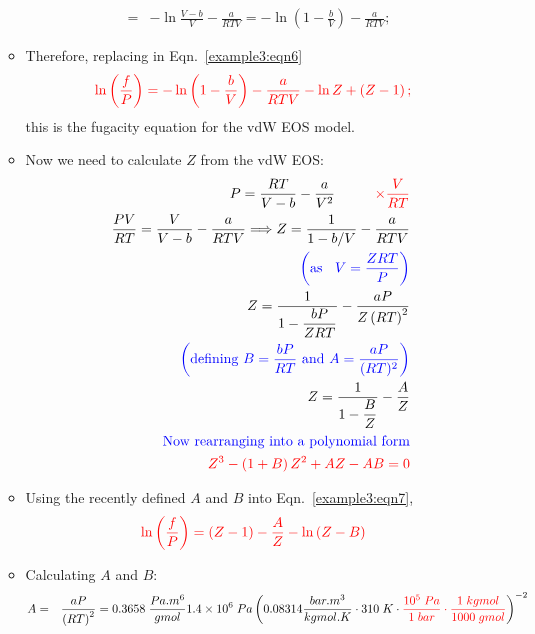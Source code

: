 \documentclass[12pts,a4paper,amsmath,amssymb,floatfix]{article}%
\newcommand{\frc}{\displaystyle\frac}
\newcommand{\red}{\textcolor{red}}
\newcommand{\blue}{\textcolor{blue}}
\begin{document}
\begin{enumerate}[label=\bfseries Example \arabic*]
\begin{itemize}
\begin{eqnarray}
           &=& -\ln\frc{V-b}{V} - \frc{a}{RTV} = -\ln\left(1-\frc{b}{V}\right) - \frc{a}{RTV}; \nonumber
        \end{eqnarray}
     \item Therefore, replacing in Eqn.~\ref{example3:eqn6}
        \begin{equation}
           \red{\ln\left(\frc{f}{P}\right) = -\ln\left(1-\frc{b}{V}\right) - \frc{a}{RTV} - \ln Z + \left(Z - 1\right);}\label{example3:eqn7}
        \end{equation}
        this is the fugacity equation for the vdW EOS model.
     \item Now we need to calculate $Z$ from the vdW EOS:           
        \begin{eqnarray}
           && P = \frc{RT}{V-b} - \frc{a}{V^{2}} \hspace{1cm} \red{\times \frc{V}{RT} } \nonumber \\
           && \frc{PV}{RT} = \frc{V}{V-b} - \frc{a}{RTV} \Longrightarrow Z=\frc{1}{1- b/V} - \frc{a}{RTV} \nonumber \\
           && \blue{\left(\text{as }\;\; V=\frc{ZRT}{P} \right)} \nonumber \\
           && Z = \frc{1}{1-\frc{bP}{ZRT}} - \frc{aP}{Z\left(RT\right)^{2}}  \nonumber \\
           && \blue{\left(\text{defining } B=\frc{bP}{RT} \text{ and } A=\frc{aP}{(RT)^{2}}\right)} \nonumber \\
           && Z = \frc{1}{1-\frc{B}{Z}}-\frc{A}{Z} \nonumber \\
           && \blue{\text{Now rearranging into a polynomial form}} \nonumber \\
           && \red{ Z^{3}-\left(1+B\right)Z^{2} + AZ -AB = 0}\label{example3:eqn8}
        \end{eqnarray}
      \item Using the recently defined $A$ and $B$ into Eqn.~\ref{example3:eqn7},
           \begin{equation}
              \red{\ln\left(\frc{f}{P}\right) = \left(Z-1\right) -\frc{A}{Z}-\ln\left(Z-B\right)}\label{example3:eqn7b}
           \end{equation}
      \item Calculating $A$ and $B$:
           \begin{eqnarray}
              A &=& \frc{aP}{\left(RT\right)^{2}}=0.3658\;\frc{Pa.m^{6}}{gmol} 1.4\times 10^{6}\;Pa \left(0.08314 \frc{bar.m^{3}}{kgmol.K}\cdot 310\;K\cdot \red{\frc{10^{5}\;Pa}{1\; bar} \cdot \frc{1\; kgmol}{1000\; gmol}}\right)^{-2} \nonumber \\

\end{eqnarray}
\end{itemize}
\end{enumerate}
\end{document}
